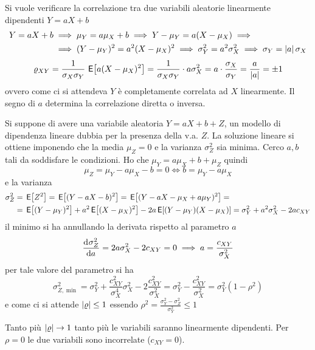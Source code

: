 \begin{esempio}
Si vuole verificare la correlazione tra due variabili aleatorie linearmente dipendenti $Y=a X+b$
\[\begin{split}Y=a X+b&\implies\mu_Y=a\mu_X+b\implies Y-\mu_Y=a(X-\mu_X)\implies\\&\implies(Y-\mu_Y)^2=a^2(X-\mu_X)^2\implies\sigma^2_Y=a^2\sigma^2_X\implies\sigma_Y=\left|{a}\right|\sigma_X\end{split}\]
\[\varrho_{XY}=\frac{1}{\sigma_X\sigma_Y}\,\,{\operatorname{\mathsf{E}}}\!\left[{a(X-\mu_X)^2}\right]=\frac{1}{\sigma_X\sigma_Y}\cdot a\sigma^2_X=a\cdot\frac{\sigma_X}{\sigma_Y}=\frac{a}{\left|{a}\right|}=\pm 1\]
ovvero come ci si attendeva $Y$ è completamente correlata ad $X$ linearmente. Il segno di $a$ determina la correlazione diretta o inversa.
\end{esempio}

\begin{esempio}
Si suppone di avere una variabile aleatoria $Y=a X+b+Z$, un modello di dipendenza lineare dubbia per la presenza della v.a. $Z$. La soluzione lineare si ottiene imponendo che la media $\mu_Z=0$ e la varianza $\sigma^2_Z$ sia minima. Cerco $a,b$ tali da soddisfare le condizioni.
Ho che $\mu_Y=a\mu_X+b+\mu_Z$ quindi \[\mu_Z=\mu_Y-a\mu_X-b=0\iff b=\mu_Y-a\mu_X\]
e la varianza
\[\begin{split}\sigma^2_Z&=\,{\operatorname{\mathsf{E}}}\!\left[{Z^2}\right]=\,{\operatorname{\mathsf{E}}}\!\left[{(Y-a X-b)^2}\right]=\,{\operatorname{\mathsf{E}}}\!\left[{(Y-a X-\mu_X+a\mu_Y)^2}\right]=\\&=\,{\operatorname{\mathsf{E}}}\!\left[{(Y-\mu_Y)^2}\right]+a^2 \,{\operatorname{\mathsf{E}}}\!\left[{(X-\mu_X)^2}\right]-2a \,{\operatorname{\mathsf{E}}}\!\left[{(Y-\mu_Y)(X-\mu_X)}\right]=\sigma^2_Y+a^2\sigma^2_X-2a c_{XY}\end{split}\]
il minimo si ha annullando la derivata rispetto al parametro $a$
\[\dfrac{\mathop{}\!\mathrm{d}^{}\sigma^2_Z}{\mathop{}\!\mathrm{d} a^{}}=2a\sigma^2_X-2c_{XY}=0 \implies a=\frac{c_{XY}}{\sigma^2_X}\]
per tale valore del parametro si ha
\[\sigma^2_{Z,\min}=\sigma^2_Y+\frac{c^2_{XY}}{\sigma^4_X}\sigma^2_X-2\frac{c^2_{XY}}{\sigma^2_X}=\sigma^2_Y-\frac{c^2_{XY}}{\sigma^2_X}=\sigma^2_Y(1-\rho^2)\]
e come ci si attende $\left|{\varrho}\right|\leq 1$ essendo $\rho^2=\frac{\sigma^2_Y-\sigma^2_Z}{\sigma^2_Y}\leq 1$

Tanto più $\left|{\varrho}\right|\to 1$ tanto più le variabili saranno linearmente dipendenti. Per $\rho=0$ le due variabili sono incorrelate ($c_{XY}=0$).
\end{esempio}

